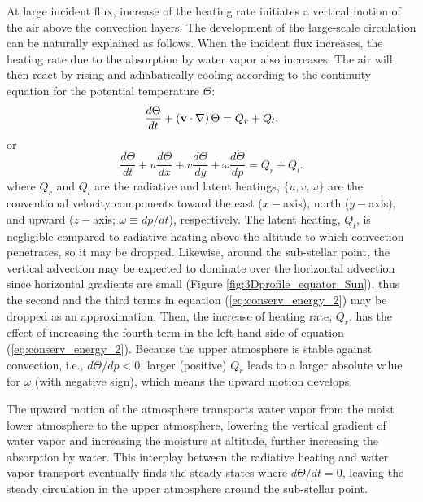 \documentclass[11pt,numberedappendix,twocolappendix,]{emulateapj}
\begin{document}
At large incident flux, increase of the heating rate initiates a vertical motion of the air above the convection layers. 
The development of the large-scale circulation can be naturally explained as follows. 
When the incident flux increases, the heating rate due to the absorption by water vapor also increases. 
The air will then react by rising and adiabatically cooling according to the continuity equation for the potential temperature $\Theta $:
\begin{equation}
\frac{d\Theta }{dt} + ( {\bf v} \cdot \nabla ) \, \Theta = Q_r + Q_l, \label{eq:conserv_energy}
\end{equation}
or
\begin{equation}
\frac{d\Theta }{dt} + u \frac{d\Theta }{dx} + v \frac{d\Theta }{dy} + \omega \frac{d\Theta }{dp} = Q_r + Q_l. \label{eq:conserv_energy_2}
\end{equation}
where $Q_r$ and $Q_l$ are the radiative and latent heatings, $\{ u, v, \omega \}$ are the conventional velocity components toward the east ($x-$axis), north ($y-$axis), and upward ($z-$axis; $\omega \equiv  dp/dt$), respectively. 
The latent heating, $Q_l$, is negligible compared to radiative heating above the altitude to which convection penetrates, so it may be dropped. 
Likewise, around the sub-stellar point, the vertical advection may be expected to dominate over the horizontal advection since horizontal gradients are small (Figure \ref{fig:3Dprofile_equator_Sun}), thus the second and the third terms in equation (\ref{eq:conserv_energy_2}) may be dropped as an approximation. 
Then, the increase of heating rate, $Q_r$, has the effect of increasing the fourth term in the left-hand side of equation (\ref{eq:conserv_energy_2}). 
Because the upper atmosphere is stable against convection, i.e., $d \Theta / d p < 0 $, larger (positive) $Q_r$ leads to a larger absolute value for $\omega $ (with negative sign), which means the upward motion develops. 

The upward motion of the atmosphere transports water vapor from the moist lower atmosphere to the upper atmosphere, lowering the vertical gradient of water vapor and increasing the moisture at altitude, further increasing the absorption by water. 
This interplay between the radiative heating and water vapor transport eventually finds the steady states where $d\Theta/dt = 0$, leaving the steady circulation in the upper atmosphere around the sub-stellar point. 
\end{document}
